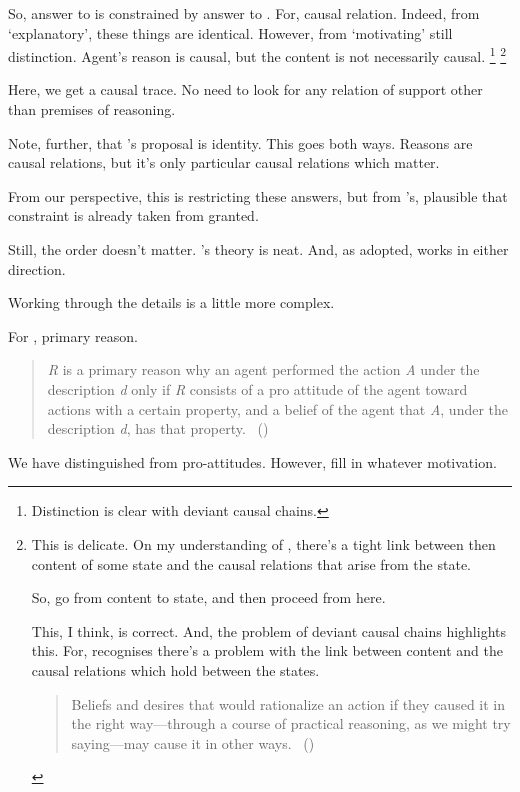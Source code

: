\begin{note}
  So, answer to \qWhy{} is constrained by answer to \qHow{}.
  For, causal relation.
  Indeed, from `explanatory', these things are identical.
  However, from `motivating' still distinction.
  Agent's reason is causal, but the content is not necessarily causal.%
  \footnote{
    Distinction is clear with deviant causal chains.
  }
  \footnote{
    This is delicate.
  On my understanding of \citeauthor{Davidson:1963aa}, there's a tight link between then content of some state and the causal relations that arise from the state.

  So, go from content to state, and then proceed from here.

  This, I think, is correct.
  And, the problem of deviant causal chains highlights this.
  For, \citeauthor{Davidson:1963aa} recognises there's a problem with the link between content and the causal relations which hold between the states.

  \begin{quote}
    Beliefs and desires that would rationalize an action if they caused it in the right way—through a course of practical reasoning, as we might try saying---may cause it in other ways.%
    \mbox{ }\hfill\mbox{(\citeyear[79]{Davidson:1973vd})}
  \end{quote}
  }

  Here, we get a causal trace.
  No need to look for any relation of support other than premises of reasoning.

  Note, further, that \citeauthor{Davidson:1963aa}'s proposal is identity.
  This goes both ways.
  Reasons are causal relations, but it's only particular causal relations which matter.

  From our perspective, this is restricting these answers, but from \citeauthor{Davidson:1963aa}'s, plausible that constraint is already taken from granted.

  Still, the order doesn't matter.
  \citeauthor{Davidson:1963aa}'s theory is neat.
  And, as adopted, works in either direction.
\end{note}

\begin{note}
  Working through the details is a little more complex.
\end{note}

\begin{note}
  For \citeauthor{Davidson:1963aa}, primary reason.

  \begin{quote}
    \emph{R} is a primary reason why an agent performed the action \emph{A} under the description \emph{d} only if \emph{R} consists of a pro attitude of the agent toward actions with a certain property, and a belief of the agent that \emph{A}, under the description \emph{d}, has that property.\newline
    \mbox{ }\hfill\mbox{(\citeyear[687]{Davidson:1963aa})}
  \end{quote}

  We have distinguished \qWhy{} from pro-attitudes.
  However, fill in whatever motivation.
\end{note}

